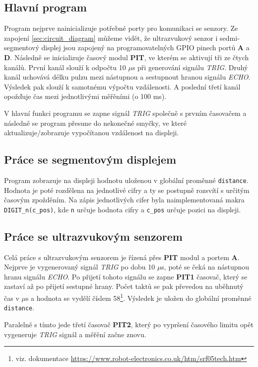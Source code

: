 \documentclass[a4paper,11pt]{article}
\begin{document}
    \subsection{Hlavní program}
    Program nejprve nainicializuje potřebné porty pro komunikaci se senzory. Ze zapojení \ref{sec:circuit_diagram} můžeme vidět,
    že ultrazvukový senzor i sedmi-segmentový displej jsou zapojený na programovatelných GPIO pinech portů \textbf{A} a \textbf{D}.
    Následně se inicializuje časový modul \textbf{PIT}, ve kterém se aktivují tři ze čtych kanálů. První kanál slouží k odpočtu 10 $\mu$s
    při generování signálu \emph{TRIG}. Druhý kanál uchovává délku pulzu mezi nástupnou a sestupnout hranou signálu \emph{ECHO}. Výsledek pak slouží
    k samotnému výpočtu vzdálenosti. A poslední třetí kanál opožďuje čas mezi jednotlivými měřěními (o 100 ms).

    V hlavní funkci programu se zapne signál \emph{TRIG} společně s prvním časovačem a následně se program přesune do
    nekonečné smyčky, ve které aktualizuje/zobrazuje vypočítanou vzdálenost na displeji.

    \subsection{Práce se segmentovým displejem}
    Program zobrazuje na displeji hodnotu uloženou v globální proměnné \verb|distance|. Hodnota je poté rozdělena na jednotlivé cifry a ty
    se postupně rozsvítí s určitým časovým zpožděním. Na zápis jednotlivých cifer byla naimplementovaná makra \verb|DIGIT_n(c_pos)|, kde \verb|n|
    určuje hodnota cifry a \verb|c_pos| určuje pozici na displeji.

    \subsection{Práce se ultrazvukovým senzorem}
    Celá práce s ultrazvukovým senzorem je řízená přes \textbf{PIT} modul a portem \textbf{A}. Nejprve je vygenerovaný signál \emph{TRIG} po dobu 10 $\mu$s,
    poté se čeká na nástupnou hranu signálu \emph{ECHO}. Po přijetí tohoto signálu se zapne \textbf{PIT1} časovač, který se zastaví až po přijetí
    sestupné hrany. Počet taktů se pak převedou na uběhnutý čas v $\mu$s a hodnota se vydělí číslem 58\footnote{viz. dokumentace \url{https://www.robot-electronics.co.uk/htm/srf05tech.htm}}.
    Výsledek je uložen do globální proměnné \verb|distance|.

    Paralelně s tímto jede třetí časovač \textbf{PIT2}, který po vypršení časového limitu opět vygeneruje \emph{TRIG} signál a měřění začne znovu.
\end{document}
